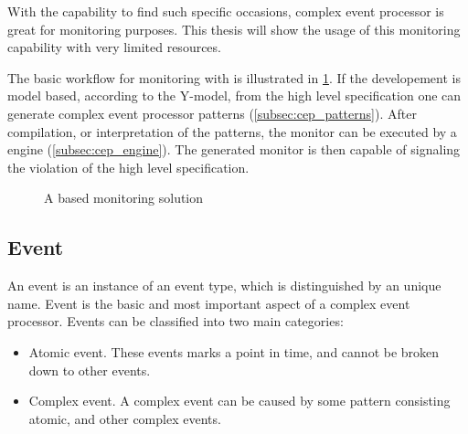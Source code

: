 With the capability to find such specific occasions, complex event processor is great for monitoring purposes. This thesis will show the usage of this monitoring capability with very limited resources.

The basic workflow for monitoring with \cep is illustrated in \cref{fig:cep_monitoring}. If the developement is model based, according to the Y-model, from the high level specification one can generate complex event processor patterns (\cref{subsec:cep_patterns}). After compilation, or interpretation of the patterns, the monitor can be executed by a \cep engine (\cref{subsec:cep_engine}). The generated monitor is then capable of signaling the violation of the high level specification.

\begin{figure}
	\centering
	\caption{A \cep based monitoring solution}
	\label{fig:cep_monitoring}
\end{figure}

\subsection{Event}
\label{subsec:cep_event}

An event is an instance of an event type, which is distinguished by an unique name.
Event is the basic and most important aspect of a complex event processor. Events can be classified into two main categories:
\begin{itemize}
	\item Atomic event. These events marks a point in time, and cannot be broken down to other events.
	\item Complex event. A complex event can be caused by some pattern consisting atomic, and other complex events.
\end{itemize}

\needspace{10em}
